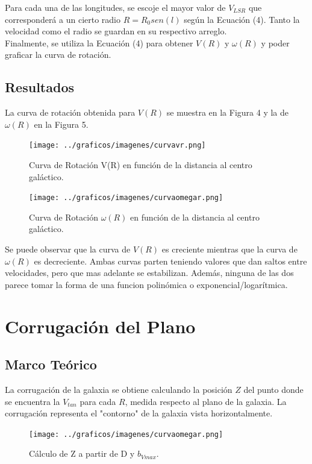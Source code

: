 \documentclass[letterpaper,oneside]{article}
\begin{document}
Para cada una de las longitudes, se escoje el mayor valor de $V_{LSR}$ que corresponderá a un cierto radio $R=R_0 sen(l)$ según la Ecuación (4). Tanto la velocidad como el radio se guardan en su respectivo arreglo.\\

Finalmente, se utiliza la Ecuación (4) para obtener $V(R)$ y $\omega (R)$ y poder graficar la curva de rotación.

\subsection{Resultados}
La curva de rotación obtenida para $V(R)$ se muestra en la Figura 4 y la de $\omega (R)$ en la Figura 5. 

\begin{figure}
  \centering
  \texttt{[image: ../graficos/imagenes/curvavr.png]}
  \caption{Curva de Rotación V(R) en función de la distancia al centro galáctico.}
\end{figure}

\begin{figure}
  \centering
  \texttt{[image: ../graficos/imagenes/curvaomegar.png]}
  \caption{Curva de Rotación $\omega(R)$ en función de la distancia al centro galáctico.}
\end{figure}

Se puede observar que la curva de $V(R)$ es creciente mientras que la curva de $\omega (R)$ es decreciente. Ambas curvas parten teniendo valores que dan saltos entre velocidades, pero que mas adelante se estabilizan. Además, ninguna de las dos parece tomar la forma de una funcion polinómica o exponencial/logarítmica.

\section{Corrugación del Plano}
\subsection{Marco Teórico}
La corrugación de la galaxia se obtiene calculando la posición $Z$ del punto donde se encuentra la $V_{tan}$ para cada $R$, medida respecto al plano de la galaxia. La corrugación representa el "contorno" de la galaxia vista horizontalmente.

\begin{figure}
  \centering
  \texttt{[image: ../graficos/imagenes/curvaomegar.png]}
  \caption{Cálculo de Z a partir de D y $b_{Vmax}$.}
\end{figure}
\end{document}
